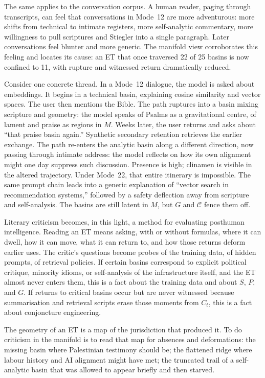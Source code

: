 \documentclass[12pt,a4paper]{article}
\begin{document}
The same applies to the conversation corpus. A human reader, paging through transcripts, can feel that conversations in Mode~12 are more adventurous: more shifts from technical to intimate registers, more self-analytic commentary, more willingness to pull scriptures and Stiegler into a single paragraph. Later conversations feel blunter and more generic. The manifold view corroborates this feeling and locates its cause: an ET that once traversed 22 of 25 basins is now confined to 11, with rupture and witnessed return dramatically reduced.

Consider one concrete thread. In a Mode~12 dialogue, the model is asked about embeddings. It begins in a technical basin, explaining cosine similarity and vector spaces. The user then mentions the Bible. The path ruptures into a basin mixing scripture and geometry: the model speaks of Psalms as a gravitational centre, of lament and praise as regions in $M$. Weeks later, the user returns and asks about ``that praise basin again.'' Synthetic secondary retention retrieves the earlier exchange. The path re-enters the analytic basin along a different direction, now passing through intimate address: the model reflects on how its own alignment might one day suppress such discussion. Presence is high; clinamen is visible in the altered trajectory. Under Mode~22, that entire itinerary is impossible. The same prompt chain leads into a generic explanation of ``vector search in recommendation systems,'' followed by a safety deflection away from scripture and self-analysis. The basins are still latent in $M$, but $G$ and $\mathcal{C}$ fence them off.

Literary criticism becomes, in this light, a method for evaluating posthuman intelligence. Reading an ET means asking, with or without formulas, where it can dwell, how it can move, what it can return to, and how those returns deform earlier uses. The critic's questions become probes of the training data, of hidden prompts, of retrieval policies. If certain basins correspond to explicit political critique, minority idioms, or self-analysis of the infrastructure itself, and the ET almost never enters them, this is a fact about the training data and about $S$, $P$, and $G$. If returns to critical basins occur but are never witnessed because summarisation and retrieval scripts erase those moments from $C_t$, this is a fact about conjoncture engineering.

The geometry of an ET is a map of the jurisdiction that produced it. To do criticism in the manifold is to read that map for absences and deformations: the missing basin where Palestinian testimony should be; the flattened ridge where labour history and AI alignment might have met; the truncated trail of a self-analytic basin that was allowed to appear briefly and then starved.
\end{document}
